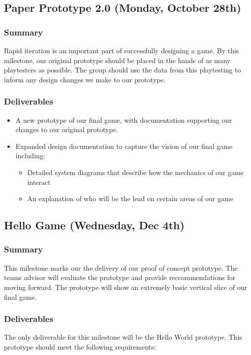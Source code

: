 \subsection{Paper Prototype 2.0 (Monday, October 28th)}

\subsubsection*{Summary}
Rapid iteration is an important part of successfully designing a game. By this
milestone, our original prototype should be placed in the hands of as many
playtesters as possible. The group should use the data from this playtesting to
inform any design changes we make to our prototype.

\subsubsection*{Deliverables}
\begin{itemize}
  \item A new prototype of our final game, with documentation supporting our
  changes to our original prototype.
  \item Expanded design documentation to capture the vision of our final game
  including:
  \begin{itemize}
    \item Detailed system diagrams that describe how the mechanics of our game
    interact
    \item An explanation of who will be the lead on certain areas of our game
  \end{itemize}
\end{itemize}

\subsection{Hello Game (Wednesday, Dec 4th)}

\subsubsection*{Summary}
This milestone marks our the delivery of our proof of concept prototype. The teams advisor will evaluate the prototype and provide reccommendations for moving forward. The prototype will show an extremely basic vertical slice of our final game. 

\subsubsection*{Deliverables}
The only deliverable for this milestone will be the Hello World prototype. This prototype should meet the following requirements:

